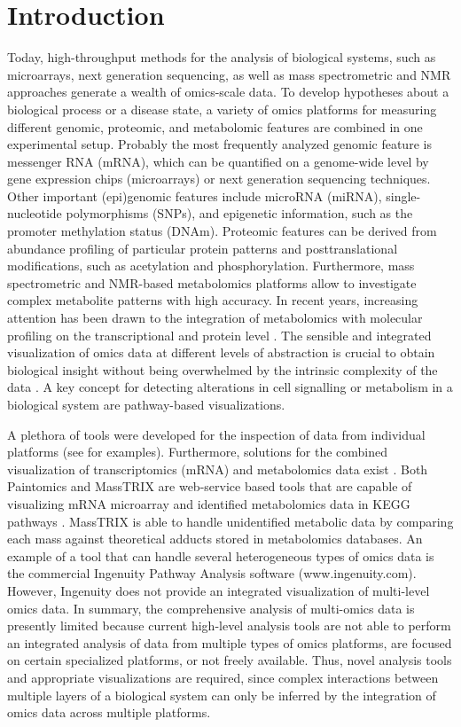 \documentclass[final,5p,times,twocolumn]{elsarticle}
\begin{document}
\section{Introduction}
Today, high-throughput methods for the analysis of biological systems, such as microarrays, next generation sequencing, as well as mass spectrometric and NMR approaches generate a wealth of omics-scale data. To develop hypotheses about a biological process or a disease state, a variety of omics platforms for measuring different genomic, proteomic, and metabolomic features are combined in one experimental setup. Probably the most frequently analyzed genomic feature is messenger RNA (mRNA), which can be quantified on a genome-wide level by gene expression chips (microarrays) or next generation sequencing techniques. Other important (epi)genomic features include microRNA (miRNA), single-nucleotide polymorphisms (SNPs), and epigenetic information, such as the promoter methylation status (DNAm). Proteomic features can be derived from abundance profiling of particular protein patterns and posttranslational modifications, such as acetylation and phosphorylation. Furthermore, mass spectrometric and NMR-based 
metabolomics platforms allow to investigate complex metabolite patterns with high accuracy. In recent years, increasing attention has been drawn to the integration of metabolomics with molecular profiling on the transcriptional and protein level \cite{Gruden2012, Amiour2012}.
The sensible and integrated visualization of omics data at different levels of abstraction is crucial to obtain biological insight without being overwhelmed by the intrinsic complexity of the data \cite{Gehlenborg2010}. A key concept for detecting alterations in cell signalling or metabolism in a biological system are pathway-based visualizations.

A plethora of tools were developed for the inspection of data from individual platforms (see \cite{Gehlenborg2010} for examples). Furthermore, solutions for the combined visualization of transcriptomics (mRNA) and metabolomics data exist \cite{Garcia-Alcalde2011,Waegele2012}. Both Paintomics \cite{Garcia-Alcalde2011} and MassTRIX \cite{Waegele2012} are web-service based tools that are capable of visualizing mRNA microarray and identified metabolomics data in KEGG pathways \cite{Kanehisa2012}. MassTRIX is able to handle unidentified metabolic data by comparing each mass against theoretical adducts stored in metabolomics databases. An example of a tool that can handle several heterogeneous types of omics data is the commercial Ingenuity Pathway Analysis software (www.ingenuity.com). However, Ingenuity does not provide an integrated visualization of multi-level omics data. In summary, the comprehensive analysis of multi-omics data is presently limited because current high-level analysis tools are not able to 
perform an integrated analysis of data from multiple types of omics platforms, are focused on certain specialized platforms, or not freely available. Thus, novel analysis tools and appropriate visualizations are required, since complex interactions between multiple layers of a biological system can only be inferred by the integration of omics data across multiple platforms.
\end{document}
